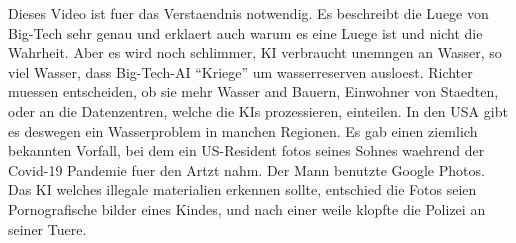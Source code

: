 \documentclass{report}
\begin{document}
\newline
\citep{ai-extinction-lie} Dieses Video ist fuer das Verstaendnis notwendig. Es beschreibt die Luege von Big-Tech sehr genau und erklaert auch warum es eine Luege ist und nicht die Wahrheit.
\newline
\newline
Aber es wird noch schlimmer, KI verbraucht unemngen an Wasser, so viel Wasser, dass Big-Tech-AI \enquote{Kriege} um wasserreserven ausloest. Richter muessen entscheiden, ob sie mehr Wasser and Bauern, Einwohner von Staedten, oder an die Datenzentren, welche die KIs prozessieren, einteilen.
In den USA gibt es deswegen ein Wasserproblem in manchen Regionen. \citep{ai-water-wars}
\newline
\newline
Es gab einen ziemlich bekannten Vorfall, bei dem ein US-Resident fotos seines Sohnes waehrend der Covid-19 Pandemie fuer den Artzt nahm. Der Mann benutzte Google Photos. Das KI welches illegale materialien erkennen sollte, entschied die Fotos seien Pornografische bilder eines Kindes, und nach einer weile klopfte die Polizei an seiner Tuere. \citep{google-photos-false-flagging}
\end{document}
